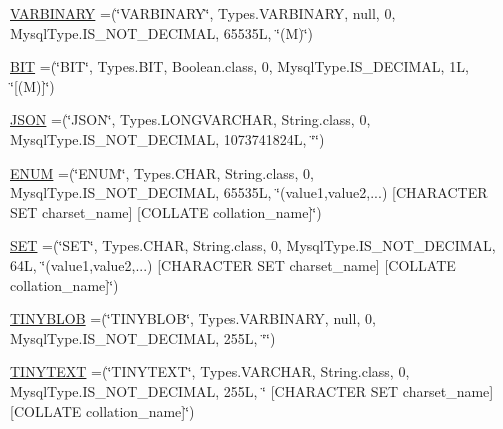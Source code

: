 \begin{DoxyCompactItemize}
\item 
\mbox{\hyperlink{enumcom_1_1mysql_1_1cj_1_1_mysql_type_a8178476164112332f2b676c85c208baa}{V\+A\+R\+B\+I\+N\+A\+RY}} =(\char`\"{}V\+A\+R\+B\+I\+N\+A\+RY\char`\"{}, Types.\+V\+A\+R\+B\+I\+N\+A\+RY, null, 0, Mysql\+Type.\+I\+S\+\_\+\+N\+O\+T\+\_\+\+D\+E\+C\+I\+M\+AL, 65535\+L, \char`\"{}(\+M)\char`\"{})
\item 
\mbox{\hyperlink{enumcom_1_1mysql_1_1cj_1_1_mysql_type_aec2c26d184d9541cf9ba34c0325d0b18}{B\+IT}} =(\char`\"{}B\+IT\char`\"{}, Types.\+B\+IT, Boolean.\+class, 0, Mysql\+Type.\+I\+S\+\_\+\+D\+E\+C\+I\+M\+AL, 1\+L, \char`\"{}\mbox{[}(\+M)\mbox{]}\char`\"{})
\item 
\mbox{\hyperlink{enumcom_1_1mysql_1_1cj_1_1_mysql_type_a876e47530339c8cb791613d5a0d04f63}{J\+S\+ON}} =(\char`\"{}J\+S\+ON\char`\"{}, Types.\+L\+O\+N\+G\+V\+A\+R\+C\+H\+AR, String.\+class, 0, Mysql\+Type.\+I\+S\+\_\+\+N\+O\+T\+\_\+\+D\+E\+C\+I\+M\+AL, 1073741824\+L, \char`\"{}\char`\"{})
\item 
\mbox{\hyperlink{enumcom_1_1mysql_1_1cj_1_1_mysql_type_a6173f156b78f3888f9c2073ccd3fda1a}{E\+N\+UM}} =(\char`\"{}E\+N\+UM\char`\"{}, Types.\+C\+H\+AR, String.\+class, 0, Mysql\+Type.\+I\+S\+\_\+\+N\+O\+T\+\_\+\+D\+E\+C\+I\+M\+AL, 65535\+L, \char`\"{}(\textquotesingle{}value1\textquotesingle{},\textquotesingle{}value2\textquotesingle{},...) \mbox{[}\+C\+H\+A\+R\+A\+C\+T\+E\+R S\+E\+T charset\+\_\+name\mbox{]} \mbox{[}\+C\+O\+L\+L\+A\+T\+E collation\+\_\+name\mbox{]}\char`\"{})
\item 
\mbox{\hyperlink{enumcom_1_1mysql_1_1cj_1_1_mysql_type_acf82f4d6ab19d38105ae67f3d1561c8e}{S\+ET}} =(\char`\"{}S\+ET\char`\"{}, Types.\+C\+H\+AR, String.\+class, 0, Mysql\+Type.\+I\+S\+\_\+\+N\+O\+T\+\_\+\+D\+E\+C\+I\+M\+AL, 64\+L, \char`\"{}(\textquotesingle{}value1\textquotesingle{},\textquotesingle{}value2\textquotesingle{},...) \mbox{[}\+C\+H\+A\+R\+A\+C\+T\+E\+R S\+E\+T charset\+\_\+name\mbox{]} \mbox{[}\+C\+O\+L\+L\+A\+T\+E collation\+\_\+name\mbox{]}\char`\"{})
\item 
\mbox{\hyperlink{enumcom_1_1mysql_1_1cj_1_1_mysql_type_a55c5e7d63a690905687b7fa55342dd9c}{T\+I\+N\+Y\+B\+L\+OB}} =(\char`\"{}T\+I\+N\+Y\+B\+L\+OB\char`\"{}, Types.\+V\+A\+R\+B\+I\+N\+A\+RY, null, 0, Mysql\+Type.\+I\+S\+\_\+\+N\+O\+T\+\_\+\+D\+E\+C\+I\+M\+AL, 255\+L, \char`\"{}\char`\"{})
\item 
\mbox{\hyperlink{enumcom_1_1mysql_1_1cj_1_1_mysql_type_a86e06f00235ee92184960c872d76076f}{T\+I\+N\+Y\+T\+E\+XT}} =(\char`\"{}T\+I\+N\+Y\+T\+E\+XT\char`\"{}, Types.\+V\+A\+R\+C\+H\+AR, String.\+class, 0, Mysql\+Type.\+I\+S\+\_\+\+N\+O\+T\+\_\+\+D\+E\+C\+I\+M\+AL, 255\+L, \char`\"{} \mbox{[}\+C\+H\+A\+R\+A\+C\+T\+E\+R S\+E\+T charset\+\_\+name\mbox{]} \mbox{[}\+C\+O\+L\+L\+A\+T\+E collation\+\_\+name\mbox{]}\char`\"{})

\end{DoxyCompactItemize}
